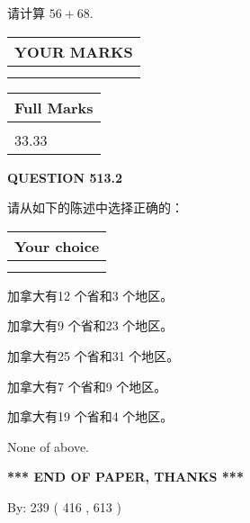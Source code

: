 \documentclass{ctexart}
\begin{document}
  
 
请计算 $ %
56 +  %
68 $.
 

 

 
  
\vspace{0.2in}
  
\noindent\begin{tabular}{|l|}
\hline
 YOUR MARKS  \\
\hline
 \\ 
 \\ 
\hline
\end{tabular}
\hspace{0.05in} \begin{tabular}{|l|}
\hline
 Full Marks  \\
\hline
 \\ 
33.33 \\
\hline
\end{tabular}
{\textbf{\Large{QUESTION
513.2 
}}}
  
  
请从如下的陈述中选择正确的：
  
  
\noindent\hspace{3.0in} \begin{tabular}{|l|}
\hline
Your choice \\
\hline
 \\ 
 \\ 
\hline
\end{tabular}
  
  
 
 
加拿大有12 个省和3 个地区。
 
 
加拿大有9 个省和23 个地区。
 
 
加拿大有25 个省和31 个地区。
 
 
加拿大有7 个省和9 个地区。
 
 
加拿大有19 个省和4 个地区。
 
 
 None of above.
 
 
   
   
 \vspace{0.2in}
 
   
   
   
   
\vspace{1.0in} 
{\textbf{\large{ *** END OF PAPER, THANKS *** }}} 
   
   
\hspace{1.0in} By: 
 239 ( 416 ,  613 )
   
\end{document}
